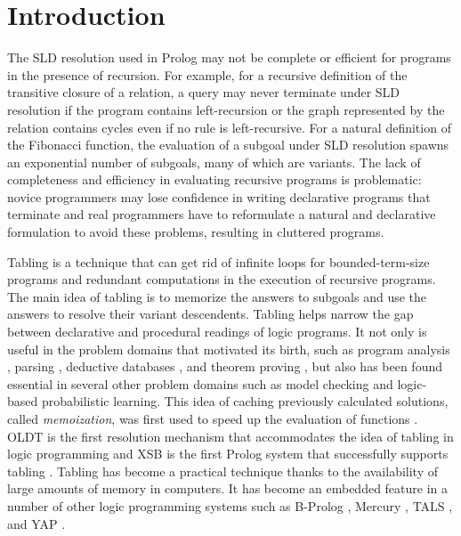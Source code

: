 \documentclass{tlp}
\begin{document}
\section{Introduction}
The SLD resolution used in Prolog may not be complete or efficient for programs in the presence of recursion. For example, for a recursive definition of the transitive closure of a relation, a query may never terminate under SLD resolution if the program contains left-recursion or the graph represented by the relation contains cycles even if no rule is left-recursive. For a natural definition of the Fibonacci function, the evaluation of a subgoal under SLD resolution spawns an exponential number of subgoals, many of which are variants. The lack of completeness and efficiency in evaluating recursive programs is problematic: novice programmers may lose confidence in writing declarative programs that terminate and real programmers have to reformulate a natural and declarative formulation to avoid these problems, resulting in cluttered programs.

Tabling \cite{Tamaki86,Warren92} is a technique that can get rid of infinite loops for bounded-term-size programs and redundant computations in the execution of recursive programs. The main idea of tabling is to memorize the answers to subgoals and use the answers to resolve their variant descendents. Tabling helps narrow the gap between declarative and procedural readings of logic programs. It not only is useful in the problem domains that motivated its birth, such as program analysis \cite{Dawson96}, parsing \cite{Eisner04,Johnson95,Warren99}, deductive databases \cite{Liu99,Ram95,Sagonas94}, and theorem proving \cite{Nielson04,Pientka03}, but also has been found essential in several other problem domains such as model checking \cite{Ram02} and logic-based probabilistic learning\cite{sato01,Zhou03:prism}. This idea of caching previously calculated solutions, called {\it memoization}, was first used to speed up the evaluation of functions \cite{Michie68}. OLDT \cite{Tamaki86} is the first resolution mechanism that accommodates the idea of tabling in logic programming and XSB is the first Prolog system that successfully supports tabling \cite{Sagonas98}. Tabling has become a practical technique thanks to the availability of large amounts of memory in computers. It has become an embedded feature in a number of other logic programming systems such as B-Prolog \cite{Zhou00,Zhou04}, Mercury \cite{Somogyi06}, TALS \cite{Guo01}, and YAP \cite{Rocha04}. 
\end{document}
